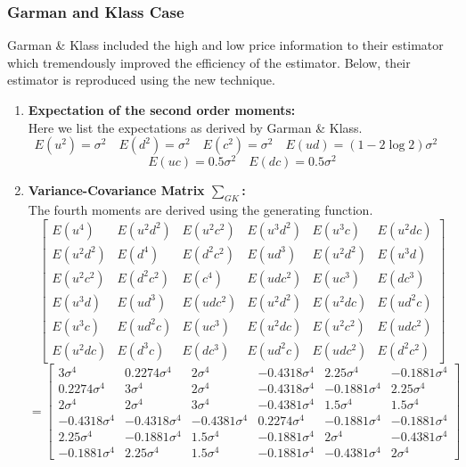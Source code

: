 \documentclass[12pt]{article}   	%
\begin{document}
\subsubsection{Garman and Klass Case}
Garman \& Klass included the high and low price information to their estimator which tremendously improved the efficiency of the estimator. Below, their estimator is reproduced using the new technique.  
\begin{enumerate}
\item \textbf{Expectation of the second order moments:}\\
Here we list the expectations as derived by Garman \& Klass.
$$ E(u^2 )=\sigma^2\quad  E(d^2 )=\sigma^2\quad  E(c^2 )=\sigma^2\quad E(ud)=(1-2\log 2)\sigma{^2} \quad $$
$$E(uc )=0.5\sigma^2\quad E(dc)=0.5\sigma^2 $$

\item \textbf{Variance-Covariance Matrix $\sum_{GK} $:}\\
The fourth moments are derived using the generating function.
 $$  \begin{bmatrix}
			E(u^4 )&E(u^2 d^2 )&E(u^2 c^2)&E(u^3 d^2 )&E(u^3 c )&E(u^2 dc)\\
			E(u^2 d^2 )&E(d^4 )&E(d^2 c^2 )&E(u d^3 )&E(u^2 d^2 )&E(u^3 d)\\
			E(u^2 c^2 )&E(d^2 c^2)&E(c^4)&E(udc^2 )&E(uc^3 )&E(dc^3)\\
			E(u^3 d)&E(ud^3 )&E(udc^2 )&E(u^2d^2 )&E(u^2 dc )&E(ud^2c)\\
			E(u^3 c )&E(ud^2 c)&E(uc^3)&E(u^2dc )&E(u^2c^2 )&E(udc^2)\\
			E(u^2 dc)&E(d^3c )&E(dc^3 )&E(ud^2c )&E(udc^2 )&E(d^2c^2)
			\end{bmatrix}$$
$$=\begin{bmatrix}
3\sigma^4&0.2274\sigma^4&2\sigma^4&-0.4318\sigma^4&2.25\sigma^4&-0.1881\sigma^4\\
0.2274\sigma^4&3\sigma^4&2\sigma^4&-0.4318\sigma^4&-0.1881\sigma^4&2.25\sigma^4\\
2\sigma^4&2\sigma^4&3\sigma^4&-0.4381\sigma^4&1.5\sigma^4&1.5\sigma^4\\
-0.4318\sigma^4&-0.4318\sigma^4&-0.4381\sigma^4&0.2274\sigma^4&-0.1881\sigma^4&-0.1881\sigma^4\\
2.25\sigma^4&-0.1881\sigma^4&1.5\sigma^4&-0.1881\sigma^4&2\sigma^4&-0.4381\sigma^4\\
-0.1881\sigma^4&2.25\sigma^4&1.5\sigma^4&-0.1881\sigma^4&-0.4381\sigma^4&2\sigma^4 
\end{bmatrix}$$


\end{enumerate}
\end{document}
